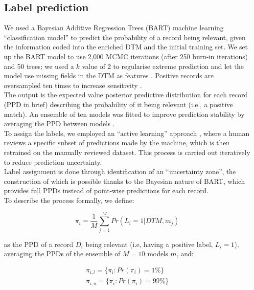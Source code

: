 \documentclass[]{bmcart}
\begin{document}
\subsection*{Label prediction}

We used a Bayesian Additive Regression Trees (BART) machine learning
``classification model'' \citep{chipman2010bart} \citep[in the
implementation of][]{kapelner2013bartmachine} to predict the probability
of a record being relevant, given the information coded into the
enriched DTM and the initial training set. We set up the BART model to
use 2,000 MCMC iterations (after 250 burn-in iterations) and 50 trees;
we used a \(k\) value of 2 to regularise extreme prediction and let the
model use missing fields in the DTM as features
\citep{kapelner2015prediction}. Positive records are oversampled ten
times to increase sensitivity \citep{batista2004study}.\\
The output is the expected value posterior predictive distribution for
each record (PPD in brief) describing the probability of it being
relevant (i.e., a positive match). An ensemble of ten models was fitted
to improve prediction stability by averaging the PPD between models
\citep{zhou2021ensemble, dietterich2000ensemble}.\\

To assign the labels, we employed an ``active learning'' approach
\citep{settles2009active, miwa2014reducing}, where a human reviews a
specific subset of predictions made by the machine, which is then
retrained on the manually reviewed dataset. This process is carried out
iteratively to reduce prediction uncertainty.\\
Label assignment is done through identification of an ``uncertainty
zone'', the construction of which is possible thanks to the Bayesian
nature of BART, which provides full PPDs instead of point-wise
predictions for each record.\\
To describe the process formally, we define:

\[\pi_i = \frac{1}{M}\sum_{j=1}^M Pr(L_i = \text{1}|DTM,m_j) \tag{Eq. 1}\]

as the PPD of a record \(D_i\) being relevant (i.e, having a positive
label, \(L_i = 1\)), averaging the PPDs of the ensemble of \(M=10\)
models \(m\), and:

\[
\begin{aligned}
\pi_{i,l} = \{\pi_i : Pr(\pi_i) = 1\%\}\\
\pi_{i,u} = \{\pi_i : Pr(\pi_i) = 99\%\}
\end{aligned}
\tag{Eq. 2}
\]
\end{document}
